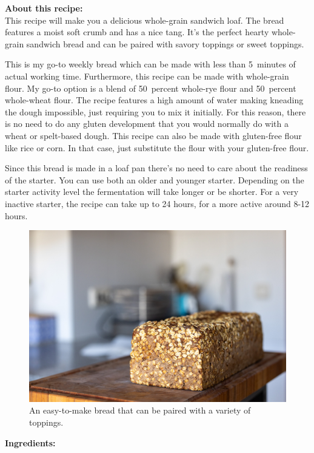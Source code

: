 \noindent\textbf{About this recipe:}\\
This recipe will make you a delicious whole-grain sandwich loaf.
The bread features a moist soft crumb and has a nice tang.
It's the perfect hearty whole-grain sandwich bread and can
be paired with savory toppings or sweet toppings.

This is my go-to weekly bread which can be made with less
than 5~minutes of actual working time. Furthermore, this recipe can be
made with whole-grain flour. My go-to option is a blend of 50~percent
whole-rye flour and 50~percent whole-wheat flour. The recipe
features a high amount of water making kneading the dough impossible,
just requiring you to mix it initially. For this reason, there
is no need to do any gluten development that you would normally do
with a wheat or spelt-based dough. This recipe can also be made
with gluten-free flour like rice or corn. In that case, just substitute
the flour with your gluten-free flour.

Since this bread is made in a loaf pan there's no need to care about
the readiness of the starter. You can use both an older and younger starter.
Depending on the starter activity level the fermentation will take longer
or be shorter. For a very inactive starter, the recipe can take up to 24 hours,
for a more active around 8-12 hours.

\begin{figure}[h]
    \centering
    \includegraphics[width=\textwidth]{whole-grain-sandwich-outside}
    \caption{An easy-to-make bread that can be paired with a variety of toppings.}
\end{figure}

\noindent\textbf{Ingredients:}

